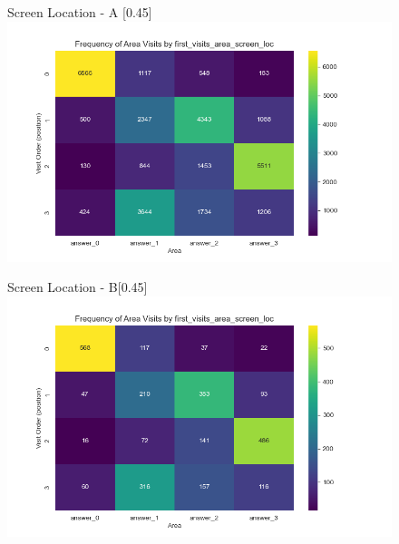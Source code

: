 \documentclass{article}
\begin{document}
    \begin{figure}[H]
          \centering
          \begin{subcaptionbox}{Screen Location - A \label{fig:a}}[0.45\textwidth]
            {\centering\includegraphics[width=\linewidth]{plots/visits/matrix__first_visits_area_screen_loc_hunters_A.png}}
          \end{subcaptionbox}
          \hfill
          \begin{subcaptionbox}{Screen Location - B\label{fig:b}}[0.45\textwidth]
            {\centering\includegraphics[width=\linewidth]{plots/visits/matrix__first_visits_area_screen_loc_hunters_B.png}}
          \end{subcaptionbox}
          
          \vspace{1em} 
        

\end{figure}
\end{document}
